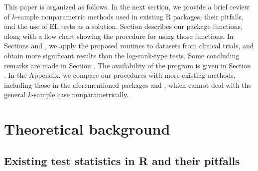 

This paper is organized as follows. In the next section, we provide a brief review of $k$-sample nonparametric methods used in existing R packages, their pitfalls, and the use of EL tests as a solution. %
Section  describes our package functions, along with a flow chart showing the procedure for using those functions. In Sections  and  , 
we apply the proposed routines 
to datasets from clinical trials, and obtain more significant results than the log-rank-type tests. Some concluding remarks are made in Section . The availability of the program is given in Section . In the Appendix, we compare our procedures with more existing methods, including those in the  aforementioned packages  and , which cannot deal with the general $k$-sample case nonparametrically.

\section{Theoretical background} \label{sec:method}

\subsection{Existing test statistics in R and their pitfalls} \label{sec:lit_tests} 

